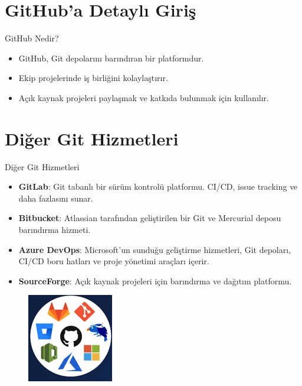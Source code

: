 \documentclass{beamer}
\begin{document}
\section{GitHub'a Detaylı Giriş}
\begin{frame}{GitHub Nedir?}
    \begin{itemize}
        \item GitHub, Git depolarını barındıran bir platformdur.
        \item Ekip projelerinde iş birliğini kolaylaştırır.
        \item Açık kaynak projeleri paylaşmak ve katkıda bulunmak için kullanılır.
    \end{itemize}

\end{frame}

\section{Diğer Git Hizmetleri}
\begin{frame}{Diğer Git Hizmetleri}
    \begin{itemize}
        \item \textbf{GitLab}: Git tabanlı bir sürüm kontrolü platformu. CI/CD, issue tracking ve daha fazlasını sunar.
        \item \textbf{Bitbucket}: Atlassian tarafından geliştirilen bir Git ve Mercurial deposu barındırma hizmeti.
        \item \textbf{Azure DevOps}: Microsoft'un sunduğu geliştirme hizmetleri, Git depoları, CI/CD boru hatları ve proje yönetimi araçları içerir.
        \item \textbf{SourceForge}: Açık kaynak projeleri için barındırma ve dağıtım platformu.
    \end{itemize}
    \begin{figure}
        \centering
        \includegraphics[width=0.5\linewidth]{img/git_hizmetleri.png}
    \end{figure}
\end{frame}
\end{document}
